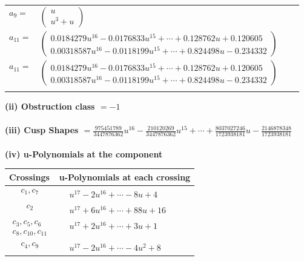 \documentclass[1p]{elsarticle_modified}
\theoremstyle{definition}
\begin{document}
\begin{tabular}{m{7pt} m{180pt} m{7pt} m{180pt} }
\flushright $a_{9}=$&$\begin{pmatrix}u\\u^3+u\end{pmatrix}$ \\
\flushright $a_{11}=$&$\begin{pmatrix}0.0184279 u^{16}-0.0176833 u^{15}+\cdots+0.128762 u+0.120605\\0.00318587 u^{16}-0.0118199 u^{15}+\cdots+0.824498 u-0.234332\end{pmatrix}$\\ \flushright $a_{11}=$&$\begin{pmatrix}0.0184279 u^{16}-0.0176833 u^{15}+\cdots+0.128762 u+0.120605\\0.00318587 u^{16}-0.0118199 u^{15}+\cdots+0.824498 u-0.234332\end{pmatrix}$\\&\end{tabular}
\flushleft \textbf{(ii) Obstruction class $= -1$}\\~\\
\flushleft \textbf{(iii) Cusp Shapes $= \frac{975451789}{3447876362} u^{16}-\frac{210120269}{3447876362} u^{15}+\cdots+\frac{8037027246}{1723938181} u-\frac{2146878348}{1723938181}$}\\~\\
\newpage\renewcommand{\arraystretch}{1}
\flushleft \textbf{(iv) u-Polynomials at the component}\newline \\
\begin{tabular}{m{50pt}|m{274pt}}
Crossings & \hspace{64pt}u-Polynomials at each crossing \\
\hline $$\begin{aligned}c_{1},c_{7}\end{aligned}$$&$\begin{aligned}
&u^{17}-2 u^{16}+\cdots-8 u+4
\end{aligned}$\\
\hline $$\begin{aligned}c_{2}\end{aligned}$$&$\begin{aligned}
&u^{17}+6 u^{16}+\cdots+88 u+16
\end{aligned}$\\
\hline $$\begin{aligned}c_{3},c_{5},c_{6}\\c_{8},c_{10},c_{11}\end{aligned}$$&$\begin{aligned}
&u^{17}+2 u^{16}+\cdots+3 u+1
\end{aligned}$\\
\hline $$\begin{aligned}c_{4},c_{9}\end{aligned}$$&$\begin{aligned}
&u^{17}-2 u^{16}+\cdots-4 u^2+8
\end{aligned}$\\
\hline
\end{tabular}\\~\\
\end{document}
